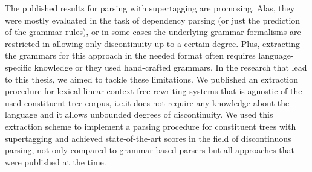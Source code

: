 \documentclass[../document.tex]{subfiles}
\begin{document}
    The published results for parsing with supertagging are promosing.
    Alas, they were mostly evaluated in the task of dependency parsing (or just the prediction of the grammar rules), or in some cases the underlying grammar formalisms are restricted in allowing only discontinuity up to a certain degree.
    Plus, extracting the grammars for this approach in the needed format often requires language-specific knowledge \citep{Kas17,Bla18} or they used hand-crafted grammars. \citep{Hoc07}
    In the research that lead to this thesis, we aimed to tackle these limitations.
    We published an extraction procedure for lexical linear context-free rewriting systems that is agnostic of the used constituent tree corpus, i.e.\@ it does not require any knowledge about the language and it allows unbounded degrees of discontinuity. \citep{MoeRup20}
    We used this extraction scheme to implement a parsing procedure for constituent trees with supertagging and achieved state-of-the-art scores in the field of discontinuous parsing, not only compared to grammar-based parsers but all approaches that were published at the time. \citep{RupMoe21,Rup22}
    
\end{document}
